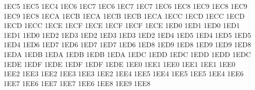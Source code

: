\setcclcucx 1EC5 1EC5 1EC4 %
\setcclcucx 1EC6 1EC7 1EC6 %
\setcclcucx 1EC7 1EC7 1EC6 %
\setcclcucx 1EC8 1EC9 1EC8 %
\setcclcucx 1EC9 1EC9 1EC8 %
\setcclcucx 1ECA 1ECB 1ECA %
\setcclcucx 1ECB 1ECB 1ECA %
\setcclcucx 1ECC 1ECD 1ECC %
\setcclcucx 1ECD 1ECD 1ECC %
\setcclcucx 1ECE 1ECF 1ECE %
\setcclcucx 1ECF 1ECF 1ECE %
\setcclcucx 1ED0 1ED1 1ED0 %
\setcclcucx 1ED1 1ED1 1ED0 %
\setcclcucx 1ED2 1ED3 1ED2 %
\setcclcucx 1ED3 1ED3 1ED2 %
\setcclcucx 1ED4 1ED5 1ED4 %
\setcclcucx 1ED5 1ED5 1ED4 %
\setcclcucx 1ED6 1ED7 1ED6 %
\setcclcucx 1ED7 1ED7 1ED6 %
\setcclcucx 1ED8 1ED9 1ED8 %
\setcclcucx 1ED9 1ED9 1ED8 %
\setcclcucx 1EDA 1EDB 1EDA %
\setcclcucx 1EDB 1EDB 1EDA %
\setcclcucx 1EDC 1EDD 1EDC %
\setcclcucx 1EDD 1EDD 1EDC %
\setcclcucx 1EDE 1EDF 1EDE %
\setcclcucx 1EDF 1EDF 1EDE %
\setcclcucx 1EE0 1EE1 1EE0 %
\setcclcucx 1EE1 1EE1 1EE0 %
\setcclcucx 1EE2 1EE3 1EE2 %
\setcclcucx 1EE3 1EE3 1EE2 %
\setcclcucx 1EE4 1EE5 1EE4 %
\setcclcucx 1EE5 1EE5 1EE4 %
\setcclcucx 1EE6 1EE7 1EE6 %
\setcclcucx 1EE7 1EE7 1EE6 %
\setcclcucx 1EE8 1EE9 1EE8 %
